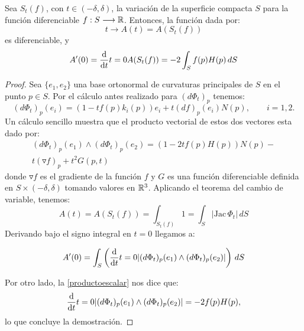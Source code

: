 \begin{proposition}
Sea $S_t(f)$, con $t \in (-\delta, \delta)$, la variación de la superficie compacta $S$ para la función diferenciable $f: S \longrightarrow \mathbb{R}$. Entonces, la función dada por:
%
\begin{equation*}
    t \longrightarrow A(t) = A(S_t(f))
\end{equation*}
%
es diferenciable, y
%
\begin{equation}\label{variacionarea}
    A'(0) = \diff{}{t}{t=0} A(S_t(f)) = -2 \int_S f(p)H(p) \, dS
\end{equation}
\end{proposition}
\begin{proof}
Sea $\{e_1, e_2\}$ una base ortonormal de curvaturas principales de $S$ en el punto $p \in S$. Por el cálculo antes realizado para $(d\Phi_t)_p$ tenemos:
%
\begin{equation*}
    (d\Phi_t)_p(e_i) = (1 - tf(p)k_i(p))e_i + t(df)_p(e_i)N(p), \qquad i=1,2.
\end{equation*}
%
Un cálculo sencillo muestra que el producto vectorial de estos dos vectores esta dado por:
%
\begin{multline}\label{productoescalar}
    (d\Phi_t)_p(e_1) \wedge (d\Phi_t)_p(e_2) = (1 - 2tf(p)H(p))N(p) - \\ t(\triangledown f)_p + t^2G(p,t)
\end{multline}
%
donde $\triangledown f$ es el gradiente de la función $f$ y $G$ es una función diferenciable definida en $S \times (-\delta, \delta)$ tomando valores en $\mathbb{R}^3$. Aplicando el teorema del cambio de variable, tenemos:
%
\begin{equation*}
    A(t) = A(S_t(f)) = \int_{S_t(f)} 1 = \int_S |\text{Jac} \, \Phi_t| \, dS
\end{equation*}
%
Derivando bajo el signo integral en $t=0$ llegamos a:

\begin{equation*}
    A'(0) = \int_S \left( \diff{}{t}{t=0} |(d\Phi_t)_p(e_1) \wedge (d\Phi_t)_p(e_2)| \right) \, dS
\end{equation*}

Por otro lado, la \autoref{productoescalar} nos dice que:
%
\begin{equation*}
    \diff{}{t}{t=0} |(d\Phi_t)_p(e_1) \wedge (d\Phi_t)_p(e_2)| = -2f(p)H(p),
\end{equation*}
%
lo que concluye la demostración.
\end{proof}


